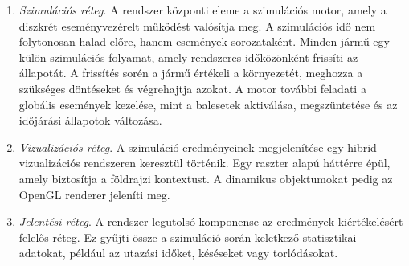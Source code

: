 \documentclass[14pt,a4paper]{extarticle}
\begin{document}
\begin{enumerate}
    \item \textit{Szimulációs réteg}. A rendszer központi eleme a szimulációs motor, amely a diszkrét eseményvezérelt működést valósítja meg. A szimulációs idő nem folytonosan halad előre, hanem események sorozataként. Minden jármű egy külön szimulációs folyamat, amely rendszeres időközönként frissíti az állapotát. A frissítés sorén a jármű értékeli a környezetét, meghozza a szükséges döntéseket és végrehajtja azokat. A motor további feladati a globális események kezelése, mint a balesetek aktiválása, megszüntetése és az időjárási állapotok változása.
    \item \textit{Vizualizációs réteg}. A szimuláció eredményeinek megjelenítése egy hibrid vizualizációs rendszeren keresztül történik. Egy raszter alapú háttérre épül, amely biztosítja a földrajzi kontextust. A dinamikus objektumokat pedig az OpenGL renderer jeleníti meg.
    \item \textit{Jelentési réteg}. A rendszer legutolsó komponense az eredmények kiértékelésért felelős réteg. Ez gyűjti össze a szimuláció során keletkező statisztikai adatokat, például az utazási időket, késéseket vagy torlódásokat.
\end{enumerate}
\end{document}
